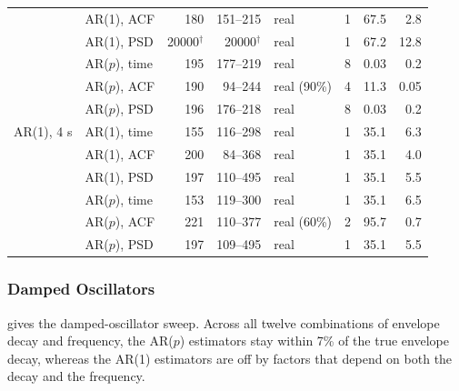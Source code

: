 \documentclass[pdflatex,sn-mathphys-num]{sn-jnl}
\begin{document}
\begin{table}[h]
\begin{tabular}{llrrlrrr}
 & AR(1), ACF & 180 & 151--215 & real & 1 & 67.5 & 2.8 \\
 & AR(1), PSD & 20000$^\dagger$ & 20000$^\dagger$ & real & 1 & 67.2 & 12.8 \\
 & AR($p$), time & 195 & 177--219 & real & 8 & 0.03 & 0.2 \\
 & AR($p$), ACF & 190 & 94--244 & real (90\%) & 4 & 11.3 & 0.05 \\
 & AR($p$), PSD & 196 & 176--218 & real & 8 & 0.03 & 0.2 \\
\midrule
AR(1), 4 s & AR(1), time & 155 & 116--298 & real & 1 & 35.1 & 6.3 \\
 & AR(1), ACF & 200 & 84--368 & real & 1 & 35.1 & 4.0 \\
 & AR(1), PSD & 197 & 110--495 & real & 1 & 35.1 & 5.5 \\
 & AR($p$), time & 153 & 119--300 & real & 1 & 35.1 & 6.5 \\
 & AR($p$), ACF & 221 & 110--377 & real (60\%) & 2 & 95.7 & 0.7 \\
 & AR($p$), PSD & 197 & 109--495 & real & 1 & 35.1 & 5.5 \\
\bottomrule
\end{tabular}
\end{table}

\subsubsection*{Damped Oscillators}

 gives the damped-oscillator sweep. Across all twelve combinations of envelope decay and frequency, the AR($p$) estimators stay within 7\% of the true envelope decay, whereas the AR(1) estimators are off by factors that depend on both the decay and the frequency.
\end{document}
